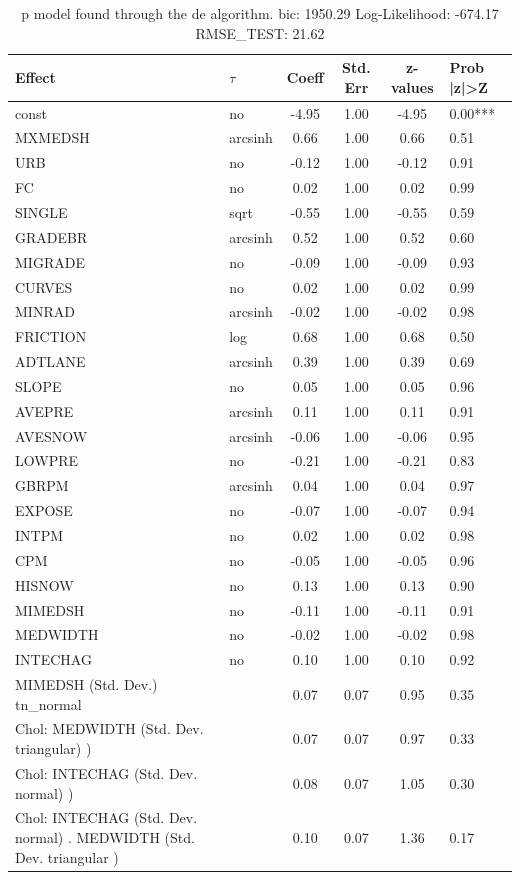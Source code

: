 \begin{table}
	\caption{p model found through the de algorithm. bic: 1950.29 Log-Likelihood: -674.17 RMSE_TEST: 21.62}
	\begin{center}
		\begin{tabular}{|l|l|c|c|c|l|}
			\hline
			Effect & $\tau$ & Coeff & Std. Err & z-values & Prob |z|>Z \\
			\hline
			const & no & -4.95 & 1.00 & -4.95 & 0.00*** \\
			\hline
			MXMEDSH & arcsinh & 0.66 & 1.00 & 0.66 & 0.51 \\
			\hline
			URB & no & -0.12 & 1.00 & -0.12 & 0.91 \\
			\hline
			FC & no & 0.02 & 1.00 & 0.02 & 0.99 \\
			\hline
			SINGLE & sqrt & -0.55 & 1.00 & -0.55 & 0.59 \\
			\hline
			GRADEBR & arcsinh & 0.52 & 1.00 & 0.52 & 0.60 \\
			\hline
			MIGRADE & no & -0.09 & 1.00 & -0.09 & 0.93 \\
			\hline
			CURVES & no & 0.02 & 1.00 & 0.02 & 0.99 \\
			\hline
			MINRAD & arcsinh & -0.02 & 1.00 & -0.02 & 0.98 \\
			\hline
			FRICTION & log & 0.68 & 1.00 & 0.68 & 0.50 \\
			\hline
			ADTLANE & arcsinh & 0.39 & 1.00 & 0.39 & 0.69 \\
			\hline
			SLOPE & no & 0.05 & 1.00 & 0.05 & 0.96 \\
			\hline
			AVEPRE & arcsinh & 0.11 & 1.00 & 0.11 & 0.91 \\
			\hline
			AVESNOW & arcsinh & -0.06 & 1.00 & -0.06 & 0.95 \\
			\hline
			LOWPRE & no & -0.21 & 1.00 & -0.21 & 0.83 \\
			\hline
			GBRPM & arcsinh & 0.04 & 1.00 & 0.04 & 0.97 \\
			\hline
			EXPOSE & no & -0.07 & 1.00 & -0.07 & 0.94 \\
			\hline
			INTPM & no & 0.02 & 1.00 & 0.02 & 0.98 \\
			\hline
			CPM & no & -0.05 & 1.00 & -0.05 & 0.96 \\
			\hline
			HISNOW & no & 0.13 & 1.00 & 0.13 & 0.90 \\
			\hline
			MIMEDSH & no & -0.11 & 1.00 & -0.11 & 0.91 \\
			\hline
			MEDWIDTH & no & -0.02 & 1.00 & -0.02 & 0.98 \\
			\hline
			INTECHAG & no & 0.10 & 1.00 & 0.10 & 0.92 \\
			\hline
			MIMEDSH (Std. Dev.) tn_normal &  & 0.07 & 0.07 & 0.95 & 0.35 \\
			\hline
			 Chol: MEDWIDTH (Std. Dev. triangular) ) &  & 0.07 & 0.07 & 0.97 & 0.33 \\
			\hline
			 Chol: INTECHAG (Std. Dev. normal) ) &  & 0.08 & 0.07 & 1.05 & 0.30 \\
			\hline
			 Chol: INTECHAG (Std. Dev. normal) . MEDWIDTH (Std. Dev.   triangular ) &  & 0.10 & 0.07 & 1.36 & 0.17 \\
			\hline
		\end{tabular}
	\end{center}
\end{table}
